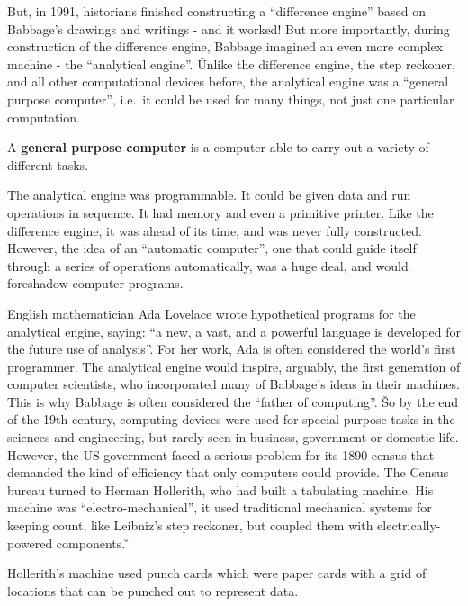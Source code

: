 
But, in 1991, historians finished constructing a ``difference engine'' based on Babbage's drawings and writings - and it
worked! But more importantly, during construction of the difference engine, Babbage imagined an even more complex
machine - the ``analytical engine''. \v

Unlike the difference engine, the step reckoner, and all other computational devices before, the analytical engine was
a ``general purpose computer'', i.e.\ it could be used for many things, not just one particular computation.

A \textbf{general purpose computer} is a computer able to carry out a variety of different tasks.
\ed

The analytical engine was programmable. It could be given data and run operations in sequence. It had memory and even
a primitive printer. Like the difference engine, it was ahead of its time, and was never fully constructed. However,
the idea of an ``automatic computer'', one that could guide itself through a series of operations automatically, was
a huge deal, and would foreshadow computer programs.


English mathematician Ada Lovelace wrote hypothetical programs for the analytical engine, saying: ``a new, a vast,
and a powerful language is developed for the future use of analysis''. For her work, Ada is often considered the
world's first programmer. The analytical engine would inspire, arguably, the first generation of computer scientists,
who incorporated many of Babbage's ideas in their machines. This is why Babbage is often considered the ``father of
computing''. \v

So by the end of the 19th century, computing devices were used for special purpose tasks in the sciences and
engineering, but rarely seen in business, government or domestic life. However, the US government faced a serious
problem for its 1890 census that demanded the kind of efficiency that only computers could provide. The Census bureau
turned to Herman Hollerith, who had built a tabulating machine. His machine was ``electro-mechanical'', it used
traditional mechanical systems for keeping count, like Leibniz's step reckoner, but coupled them with
electrically-powered components. \v


Hollerith's machine used punch cards which were paper cards with a grid of locations that can be punched out to
represent data.

